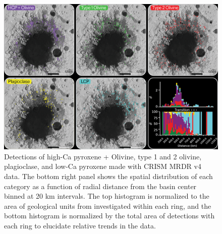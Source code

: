 \documentclass[11pt]{article}
\begin{document}
\begin{figure}
    \centering
    \includegraphics[width=\textwidth]
    {figures/02_Argyre_Minerals_Context_v2.png}
    \caption{Detections of high-Ca pyroxene + Olivine, type 1 and 2 olivine, plagioclase, and low-Ca pyroxene made with CRISM MRDR v4 data. The bottom right panel shows the spatial distribution of each category as a function of radial distance from the basin center binned at 20 km intervals. The top histogram is normalized to the area of geological units from \citet{Dohm2015} investigated within each ring, and the bottom histogram is normalized by the total area of detections with each ring to elucidate relative trends in the data.}
    \label{fig:detections}
\end{figure}
\end{document}
